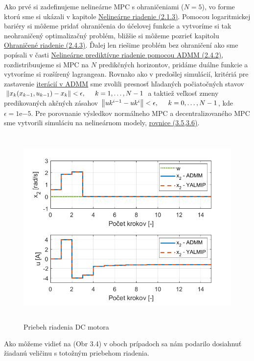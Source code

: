 Ako prvé si zadefinujeme nelineárne MPC s ohraničeniami ($N = 5$), vo forme ktorú sme si ukázali v kapitole  \hyperref[subse:NelinearneMPC]{Nelineárne riadenie (2.1.3)}. Pomocou logaritmickej bariéry si môžeme pridať ohraničenia do účelovej funkcie a vytvoríme si tak neohraničený optimalizačný problém, bližšie si môžeme pozrieť kapitolu \hyperref[subse:Ohranicenia]{Ohraničené riadenie (2.4.3)}. Ďalej len riešime problém bez ohraničení ako sme popísali v časti \hyperref[subse:Nelin_MPC_ADMM]{Nelineárne prediktívne riadenie pomocou ADMM (2.4.2)}, rozdistribuujeme si MPC na $N$ predikčných horizontov, pridáme duálne funkcie a vytvoríme si rozšírený lagrangean. Rovnako ako v predošlej simulácií, kritériá pre zastavenie \hyperref[subse:ADMM2]{iterácií v ADMM} sme zvolili presnosť hľadaných počiatočných stavov $\left\lVert x_{k}(x_{k-1},u_{k-1})- x_{k}\right\rVert < \epsilon,\hspace{0.5cm} k=1,\dots,N-1$ a taktiež veľkosť zmeny predikovaných akčných zásahov $\left\lVert u{k}^{i-1}-u{k}^{i}\right\rVert < \epsilon,\hspace{0.5cm} k=0,\dots,N-1$, kde $\epsilon = 1\mathrm{e}{-5}$. Pre porovnanie výsledkov normálneho MPC a decentralizovaného MPC sme vytvorili simuláciu na nelineárnom modely, \hyperref[math:model_DC]{rovnice (3.5,3.6)}.
\begin{figure}[H]
	\centering
	\includegraphics[width=13cm,height=10cm]{images/DC_motor/Priebeh_riadenia_a_akcne_zasahy}
	\caption{Priebeh riadenia DC motora}
	\label{fig7: PR}
\end{figure}
Ako môžeme vidieť na (Obr 3.4) v oboch prípadoch sa nám podarilo dosiahnuť žiadanú veličinu s totožným priebehom riadenia. 
